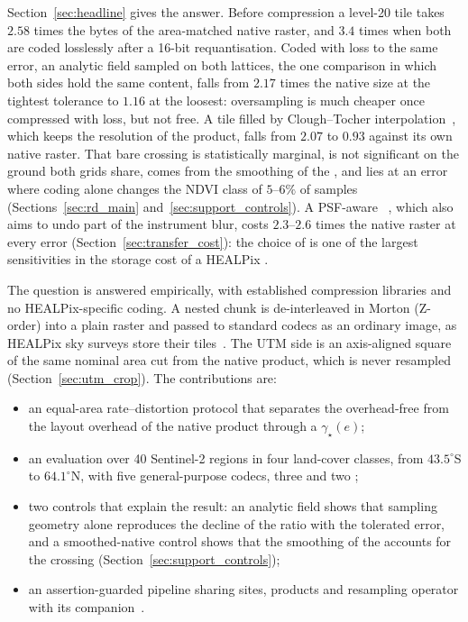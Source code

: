 Section~\ref{sec:headline} gives the answer. Before compression a
level-20 tile takes $2.58$ times the bytes of the area-matched native
raster, and $3.4$ times when both are coded losslessly after a 16-bit
requantisation. Coded with loss to the same error, an analytic field
sampled on both lattices, the one comparison in which both sides hold
the same content, falls from $2.17$ times the native size at the
tightest tolerance to $1.16$ at the loosest: oversampling is much
cheaper once compressed with loss, but not free. A tile filled by
Clough--Tocher interpolation~\cite{clough1965plate}, which keeps the
resolution of the product, falls from $2.07$ to $0.93$ against its own
native raster. That bare crossing is statistically marginal, is not
significant on the ground both grids share, comes from the smoothing of
the , and lies at an error where coding alone changes
the NDVI class of $5$--$6\%$ of samples
(Sections~\ref{sec:rd_main} and~\ref{sec:support_controls}). A PSF-aware
~\cite{delouis2026resample}, which also aims to undo part
of the instrument blur, costs $2.3$--$2.6$ times the native raster at
every error (Section~\ref{sec:transfer_cost}): the choice of
 is one of the largest sensitivities in the storage cost
of a HEALPix .

The question is answered empirically, with established compression
libraries and no HEALPix-specific coding. A nested chunk is
de-interleaved in Morton (Z-order) into a plain raster and passed to
standard codecs as an ordinary image, as HEALPix sky surveys store their
tiles~\cite{fernique2015hips}. The UTM side is an axis-aligned square of
the same nominal area cut from the native product, which is never
resampled (Section~\ref{sec:utm_crop}). The contributions are:
\begin{itemize}
    \item an equal-area rate--distortion protocol that separates the
    overhead-free  from the layout overhead of the
    native product through a  $\gamma_\star(e)$;
    \item an evaluation over 40 Sentinel-2 regions in four land-cover
    classes, from $43.5^\circ$S to $64.1^\circ$N, with five
    general-purpose codecs, three  and two
    ;
    \item two controls that explain the result: an analytic field shows
    that sampling geometry alone reproduces the decline of the ratio
    with the tolerated error, and a smoothed-native control shows that
    the smoothing of the  accounts for the crossing
    (Section~\ref{sec:support_controls});
    \item an assertion-guarded pipeline sharing sites, products
    and resampling operator with its companion~\cite{delouis2026resample}.
\end{itemize}

